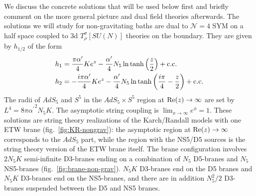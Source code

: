 \documentclass[aps,prd,11pt,notitlepage,longbibliography,nofootinbib,tightenlines,preprintnumbers]{revtex4-1}
\def\Re{\mathop{\rm Re}}
\begin{document}
We discuss the concrete solutions that will be used below first and briefly comment on the more general picture and dual field theories afterwards.
The solutions we will study for non-gravitating baths are dual to $\mathcal N=4$ SYM on a half space coupled to 3d $T_\rho^\sigma[SU(N)]$ theories on the boundary.
They are given by $h_{1/2}$ of the form
\begin{align}\label{eq:h1h2-BCFT}
	h_1&=\frac{\pi \alpha^\prime}{4} K e^z-\frac{\alpha^\prime}{4}N_5\ln\tanh\left(\frac{z}{2}\right)+\rm{c.c.}
	\nonumber\\
	h_2&=-\frac{i\pi\alpha^\prime}{4}K e^z-\frac{\alpha^\prime}{4}N_5\ln\tanh\left(\frac{i\pi}{4}-\frac{z}{2}\right)+\rm{c.c.}
\end{align}
The radii of $AdS_5$ and $S^5$ in the $AdS_5\times S^5$ region at $\Re(z)\rightarrow\infty$ are set by $L^4=8\pi{\alpha^\prime}^2N_5K$.
The asymptotic string coupling is $\lim_{x\rightarrow\infty}e^\phi=1$.
These solutions are string theory realizations of the Karch/Randall models with one ETW brane (fig.~\ref{fig:KR-nongrav}): the asymptotic region at $\Re(z)\rightarrow\infty$ corresponds to the $AdS_5$ part, while the region with the NS5/D5 sources is the string theory version of the ETW brane itself.
%
The brane configuration involves $2N_5K$ semi-infinite D3-branes ending on a combination of $N_5$ D5-branes and $N_5$ NS5-branes (fig.~\ref{fig:brane-non-grav}).
$N_5K$ D3-branes end on the D5 branes and $N_5K$ D3-branes end on the NS5-branes, and there are in addition $N_5^2/2$ D3-branes suspended between the D5 and NS5 branes.
\end{document}
